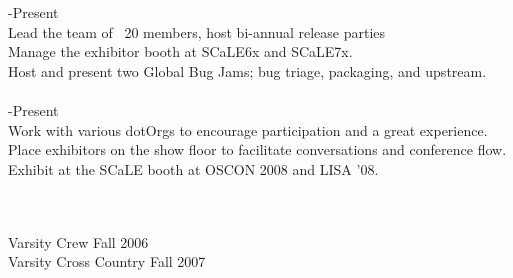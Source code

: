 \documentclass{res}
\begin{document}
\begin{resume}
\begin{tabbing}
    \hspace{-0.25in}{\bf Community Leader, Ubuntu California Local Community Team} \> -Present\\
	Lead the team of ~20 members, host bi-annual release parties \\
	Manage the exhibitor booth at SCaLE6x and SCaLE7x. \\
	Host and present two Global Bug Jams; bug triage, packaging, and upstream. \\

\\

    \hspace{-0.25in}{\bf Community Relations Committee, Southern California Linux Expo} \> -Present\\
	 Work with various dotOrgs to encourage participation and a great experience.\\
	 Place exhibitors on the show floor to facilitate conversations and conference flow.\\
	 Exhibit at the SCaLE booth at OSCON 2008 and LISA '08.
	 \end{tabbing}

\\

    \hspace{-0.25in}{\bf Chapman University Athletics}\\
	Varsity Crew \> \>\hspace{0.2in}Fall 2006\\
	Varsity Cross Country \> \>\hspace{0.2in}Fall 2007\\

\end{resume}
\end{document}
